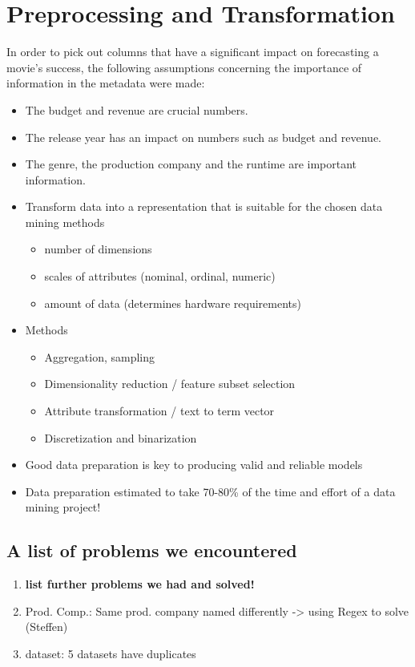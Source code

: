 \chapter{Preprocessing and Transformation}
\label{cha:preprocessing_transformation}

In order to pick out columns that have a significant impact on forecasting a movie's success, the following assumptions concerning the importance of information in the metadata were made:
\begin{itemize}
	\item The budget and revenue are crucial numbers.
	\item The release year has an impact on numbers such as budget and revenue.
	\item The genre, the production company and the runtime are important information.
\end{itemize}

\begin{itemize}
	\item Transform data into a representation that is suitable for the chosen data mining methods
	\begin{itemize}
		\item number of dimensions
		\item scales of attributes (nominal, ordinal, numeric)
		\item amount of data (determines hardware requirements)
	\end{itemize}
	\item Methods
	\begin{itemize}
		\item Aggregation, sampling
		\item Dimensionality reduction / feature subset selection
		\item Attribute transformation / text to term vector
		\item Discretization and binarization
	\end{itemize}
	\item Good data preparation is key to producing valid and reliable models
	\item Data preparation estimated to take 70-80\% of the time and effort of a data mining project!
\end{itemize}

\section{A list of problems we encountered}
\begin{enumerate}
	\item \textbf{list further problems we had and solved!}
	\item Prod. Comp.: Same prod. company named differently -> using Regex to solve (Steffen)
	\item dataset: 5 datasets have duplicates
\end{enumerate}



